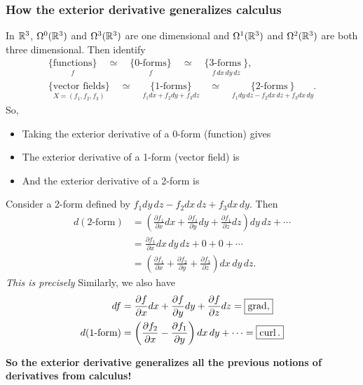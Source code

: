 \documentclass[xcolor=dvipsnames]{beamer}
\begin{document}
    \begin{frame}
        \frametitle{How the exterior derivative generalizes calculus} 
        In $\mathbb{R}^3$, $\Omega^0(\mathbb{R}^3)$ and $\Omega^3(\mathbb{R}^3)$ are one dimensional and $\Omega^1(\mathbb{R}^3)$ and $\Omega^2(\mathbb{R}^3)$ are both three dimensional. Then identify
            \begin{gather*}
   \underset{f}{ \{\text{functions} \} } \quad \simeq \quad \underset{f}{\{0\text{-forms} \}}  \quad \simeq \quad \underset{f\,dx\,dy\,dz}{\{3\text{-forms} \ \} 
}  ,   \\
\underset{X=(f_1,f_2,f_3)}{ \{\text{vector fields} \} } \quad \simeq \quad \underset{f_1dx+f_2dy+f_3dz}{\{1\text{-forms} \}}  \quad \simeq \quad \underset{f_1dy\,dz-f_2dx\,dz+f_3dx\,dy}{\{2\text{-forms} \ \} 
}  .
    \end{gather*}So,
    \begin{itemize}
        \item<2->Taking the exterior derivative of a 0-form (function) gives 
        \item<3->The exterior derivative of a 1-form (vector field) is 
        \item<4->And the exterior derivative of a 2-form is 
    \end{itemize}
    \end{frame}

    \begingroup
    \small
    \begin{frame}
       \begin{example}
        Consider a 2-form defined by $f_1dy\,dz-f_2dx\,dz+f_3dx\,dy$. Then 
\begin{align*}
              d(2\text{-form})&=\left( \frac{\partial f_1}{\partial x}dx+\frac{\partial f_1}{\partial y}dy+\frac{\partial f_1}{\partial z}dz \right) dy\,dz+\cdots \\
                              &=\frac{\partial f_1}{\partial x}dx\,dy\,dz+0+0+\cdots \\
                              &=\left( \frac{\partial f_1}{\partial x}+\frac{\partial f_2}{\partial y}+\frac{\partial f_3}{\partial z}  \right) dx\,dy\,dz.
\end{align*}
          \pause\emph{This is precisely } Similarly, we also have 
          \begin{align*}
              df&=\frac{\partial f}{\partial x}dx+\frac{\partial f}{\partial y}dy+\frac{\partial f}{\partial z}dz=\boxed{\operatorname{grad} ,}\\
              d(1\text{-form} )&=\left( \frac{\partial f_2}{\partial x}-\frac{\partial f_1}{\partial y} \right) dx\,dy+\cdots =\boxed{\operatorname{curl}.}
          \end{align*}
       \end{example} \pause
       \textbf{So the exterior derivative generalizes all the previous notions of derivatives from calculus!} 
    \end{frame}
\endgroup
\end{document}
